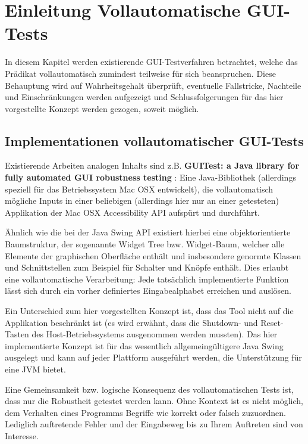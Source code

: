 \chapter{Einleitung \glqq{}Vollautomatische GUI-Tests\grqq{}}\label{chapter:introfullautoguitesting}


In diesem Kapitel werden existierende GUI-Testverfahren betrachtet, welche das Prädikat
\glqq{}vollautomatisch\grqq{} zumindest teilweise für sich beanspruchen. Diese Behauptung wird
auf Wahrheitsgehalt überprüft, eventuelle Fallstricke, Nachteile und Einschränkungen werden aufgezeigt
und Schlussfolgerungen für das hier vorgestellte Konzept werden gezogen, soweit möglich.


\section{Implementationen vollautomatischer GUI-Tests}\label{section:fullautoguitestsimpl}


Existierende Arbeiten analogen Inhalts sind z.B. \textbf{\glqq{}GUITest: a Java library for fully automated
GUI robustness testing\grqq{}} \cite{GUITestBauersfeld}: Eine Java-Bibliothek 
(allerdings speziell für das Betriebssystem Mac OSX entwickelt), die
vollautomatisch mögliche Inputs in einer beliebigen (allerdings hier nur an einer getesteten)
Applikation der \glqq{}Mac OSX Accessibility API\grqq{} aufspürt und durchführt.

Ähnlich wie die bei der Java Swing API existiert hierbei eine objektorientierte Baumstruktur,
der sogenannte \glqq{}Widget Tree\grqq{} bzw. Widget-Baum, welcher alle Elemente der graphischen Oberfläche enthält
und insbesondere genormte Klassen und Schnittstellen zum Beispiel für Schalter
und Knöpfe enthält. Dies erlaubt eine vollautomatische Verarbeitung:
Jede tatsächlich implementierte Funktion lässt sich durch ein vorher definiertes
\glqq{}Eingabealphabet\grqq{} erreichen und auslösen.

Ein Unterschied zum
hier vorgestellten Konzept ist, dass das Tool nicht auf die Applikation beschränkt ist (es wird
erwähnt, dass die Shutdown- und Reset-Tasten des Host-Betriebssystems ausgenommen werden
mussten). Das hier implementierte Konzept ist für das wesentlich allgemeingültigere Java Swing
ausgelegt und kann auf jeder Plattform ausgeführt werden, die Unterstützung für eine JVM bietet.

Eine Gemeinsamkeit bzw. logische Konsequenz des vollautomatischen Tests ist, dass nur
die Robustheit getestet werden kann. Ohne Kontext ist es nicht möglich, dem Verhalten eines
Programms Begriffe wie \glqq{}korrekt\grqq{} oder \glqq{}falsch\grqq{} zuzuordnen. Lediglich auftretende
Fehler und der Eingabeweg bis zu Ihrem Auftreten sind von Interesse.

